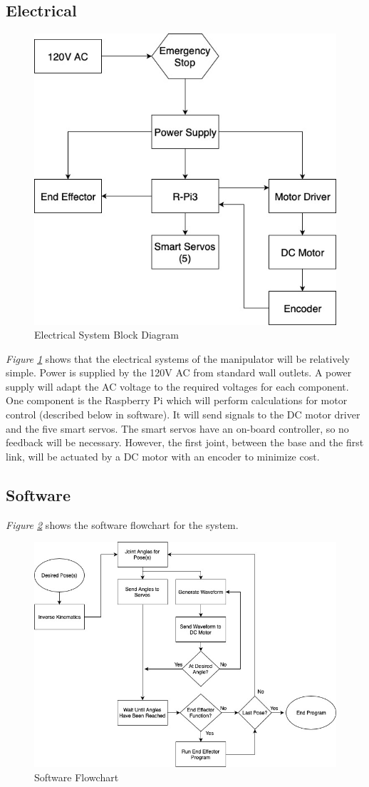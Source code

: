 \documentclass[12pt]{report}
\begin{document}
\subsection{Electrical}

\begin{figure}[htp]
  \centering
  \includegraphics[width=.55\textwidth]{eblock}
  \caption{Electrical System Block Diagram}
  \label{fig:eblock}
\end{figure}

\emph{Figure \ref{fig:eblock}} shows that the electrical systems of the manipulator will be relatively simple. Power is supplied by the 120V AC from standard wall outlets. A power supply will adapt the AC voltage to the required voltages for each component. One component is the Raspberry Pi which will perform calculations for motor control (described below in software). It will send signals to the DC motor driver and the five smart servos. The smart servos have an on-board controller, so no feedback will be necessary. However, the first joint, between the base and the first link, will be actuated by a DC motor with an encoder to minimize cost.

\subsection{Software}
\emph{Figure \ref{fig:sblock}} shows the software flowchart for the system.
\begin{figure}[ht]
  \centering
  \includegraphics[width=.85\textwidth]{sblock}
  \caption{Software Flowchart}
  \label{fig:sblock}
\end{figure}
\end{document}
